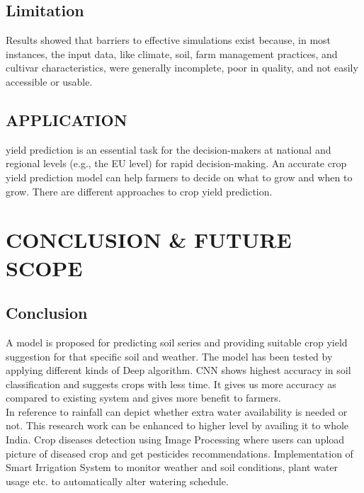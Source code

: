 \documentclass[oneside,a4paper,12pt]{report}
\begin{document}
\section{Limitation}
\item Results showed that barriers to effective simulations exist because, in most instances, the input data, like climate, soil, farm management practices, and cultivar characteristics, were generally incomplete, poor in quality, and not easily accessible or usable.\\

\section{APPLICATION}
\item yield prediction is an essential task for the decision-makers at national and regional levels (e.g., the EU level) for rapid decision-making. An accurate crop yield prediction model can help farmers to decide on what to grow and when to grow. There are different approaches to crop yield prediction.

 \chapter{CONCLUSION & FUTURE SCOPE}
 \section {Conclusion}
\item 
A model is proposed for predicting soil series and providing suitable crop yield suggestion for that specific soil and weather. 
The model has been tested by applying different kinds of Deep algorithm. 
CNN shows highest accuracy in soil classification and suggests crops with less time. It gives us more accuracy as compared to existing system and gives more benefit to farmers.\\
In reference to rainfall can depict whether extra water availability is needed or not. This research work can be enhanced to higher level by availing it to whole India.
Crop diseases detection using Image Processing where users can upload picture of diseased crop and get pesticides recommendations. 
Implementation of Smart Irrigation System to monitor weather and soil conditions, plant water usage etc. to automatically alter watering schedule.
\end{document}
